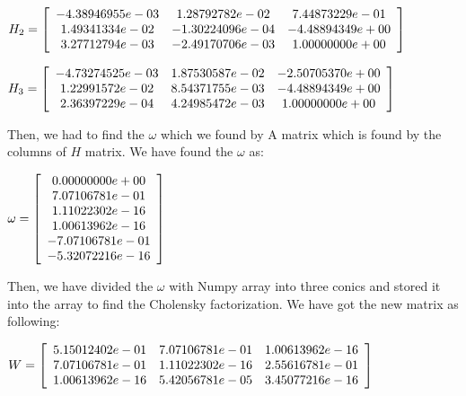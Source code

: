\documentclass[]{article}
\begin{document}
\vspace{0.5em}

\centerline {
	$H_2 =\left[ {\begin{array}{*{20}c}
		-4.38946955e-03 & 1.28792782e-02 & 7.44873229e-01 \\
		1.49341334e-02 & -1.30224096e-04 & -4.48894349e+00  \\ 
		3.27712794e-03 & -2.49170706e-03 & 1.00000000e+00
		\end{array} } \right] $
}

\vspace{0.5em}


\centerline {
	$H_3 =\left[ {\begin{array}{*{20}c}
		-4.73274525e-03 & 1.87530587e-02 & -2.50705370e+00 \\
		1.22991572e-02 & 8.54371755e-03 & -4.48894349e+00  \\ 
		2.36397229e-04 & 4.24985472e-03 & 1.00000000e+00
		\end{array} } \right] $
}

Then, we had to find the $\omega$ which we found by A matrix which is found by the columns of $H$ matrix. We have found the $\omega$ as:

\vspace{0.5em}

\centerline {
	$ \omega =\left[ {\begin{array}{*{20}c}
		0.00000000e+00 \\
		7.07106781e-01 \\
		1.11022302e-16 \\
		1.00613962e-16 \\ 
		-7.07106781e-01 \\
		-5.32072216e-16
		\end{array} } \right] $
}

Then, we have divided the $\omega$ with Numpy array into three conics and stored it into the array to find the Cholensky factorization. We have got the new matrix as following:

\vspace{0.5em}

\centerline {
	$ W =\left[ {\begin{array}{*{20}c}
		5.15012402e-01 & 7.07106781e-01 & 1.00613962e-16 \\
		7.07106781e-01 & 1.11022302e-16 & 2.55616781e-01\\
		1.00613962e-16 & 5.42056781e-05 & 3.45077216e-16 
		\end{array} } \right] $
}
\end{document}
